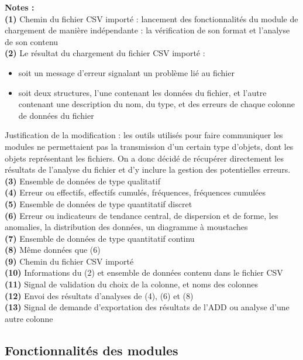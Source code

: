 		\textbf{Notes :}\\
			\textbf{({\color{red}1})} Chemin du fichier CSV importé : lancement des fonctionnalités du module de chargement de manière indépendante : la vérification de son format et l'analyse de son contenu\\
			\textbf{({\color{red}2})} Le résultat du chargement du fichier CSV importé :
			\begin{itemize}
				\item soit un message d'erreur signalant un problème lié au fichier
				\item soit deux structures, l'une contenant les données du fichier, et l'autre contenant une description du nom, du type, et des erreurs de chaque colonne de données du fichier
			\end{itemize}
			{\color{red}Justification de la modification :} les outils utilisés pour faire communiquer les modules ne permettaient pas la transmission d'un certain type d'objets, dont les objets représentant les fichiers. On a donc décidé de récupérer directement les résultats de l'analyse du fichier et d'y inclure la gestion des potentielles erreurs.\\
			\textbf{(3)} Ensemble de données de type qualitatif\\
			\textbf{(4)} Erreur ou effectifs, effectifs cumulés, fréquences, fréquences cumulées\\
			\textbf{(5)} Ensemble de données de type quantitatif discret\\
			\textbf{(6)} Erreur ou indicateurs de tendance central, de dispersion et de forme, les anomalies, la distribution des données, un diagramme à moustaches\\
			\textbf{(7)} Ensemble de données de type quantitatif continu\\
			\textbf{(8)} Même données que (6)\\
			\textbf{(9)} Chemin du fichier CSV importé \\
			\textbf{(10)} Informations du (2) et ensemble de données contenu dans le fichier CSV \\
			\textbf{(11)} Signal de validation du choix de la colonne, et noms des colonnes\\
			\textbf{(12)} Envoi des résultats d'analyses de (4), (6) et (8)\\
			\textbf{(13)} Signal de demande d'exportation des résultats de l'ADD ou analyse d'une autre colonne\\		
		
		\subsection{Fonctionnalités des modules}
			
